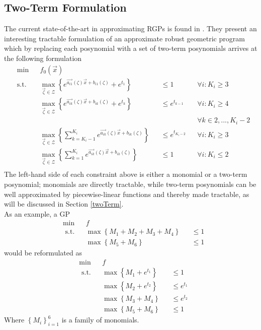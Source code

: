 \subsection{Two-Term Formulation}
The current state-of-the-art in approximating RGPs is found in \cite{hsiung_kim_boyd_2007}. They present an interesting tractable formulation of an approximate robust geometric program which by replacing each posynomial with a set of two-term posynomials arrives at the following formulation
\begin{equation}
\begin{aligned}
& \min &&f_0\left(\vec{x}\right)\\
& \text{s.t.} &&\max_{\vec{\zeta} \in \mathcal{Z}} \left\{e^{\vec{a_{i1}}\left(\zeta\right)\vec{x} + b_{i1}\left(\zeta\right)} + e^{t_1}\right\} &&\leq 1 &&\forall i:K_i \geq 3\\
& &&\max_{\vec{\zeta} \in \mathcal{Z}} \left\{e^{\vec{a_{ik}}\left(\zeta\right)\vec{x} + b_{ik}\left(\zeta\right)} + e^{t_k}\right\} &&\leq e^{t_{k-1}} &&\forall i:K_i \geq 4 \\ & && && && \forall k \in 2,...,K_i-2\\
& &&\max_{\vec{\zeta} \in \mathcal{Z}} \left\{\textstyle{\sum}_{k=K_i-1}^{K_i}e^{\vec{a_{ik}}\left(\zeta\right)\vec{x} + b_{ik}\left(\zeta\right)}\right\} &&\leq e^{t_{K_i-2}} &&\forall i:K_i \geq 3\\
& &&\max_{\vec{\zeta} \in \mathcal{Z}} \left\{\textstyle{\sum}_{k=1}^{K_i}e^{\vec{a_{ik}}\left(\zeta\right)\vec{x} + b_{ik}\left(\zeta\right)}\right\} &&\leq 1 &&\forall i:K_i \leq 2\\
\end{aligned}
\label{Boyd_formulation}
\end{equation}
The left-hand side of each constraint above is either a monomial or a two-term posynomial; monomials are directly tractable, while two-term posynomials can be well approximated by piecewise-linear functions and thereby made tractable, as will be discussed in Section \ref{twoTerm}.\\
As an example, a GP 
\begin{displaymath}
\begin{aligned}
    & \min &&f\\
    & \text{ s.t.} &&\max\left\{M_1 + M_2 + M_3 + M_4\right\} &&\leq 1\\
    & && \max\left\{M_5 + M_6\right\} &&\leq 1
\end{aligned}
\end{displaymath}
would be reformulated as
\begin{displaymath}
\begin{aligned}
    & \min &&f\\
    & \text{ s.t.} && \max\left\{M_1 + e^{t_1}\right\} && \leq 1\\
    & && \max\left\{M_2 + e^{t_2}\right\} && \leq e^{t_1}\\
    & && \max\left\{M_3 + M_4\right\} && \leq e^{t_2}\\
    & && \max\left\{M_5 + M_6\right\} &&\leq 1
\end{aligned}
\end{displaymath}
Where $\left\{M_i\right\}_{i=1}^{6}$ is a family of monomials.

